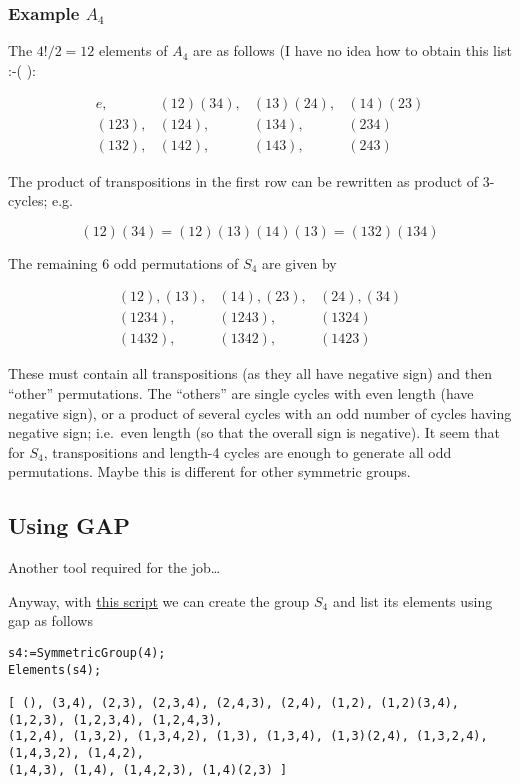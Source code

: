 \subsubsection{\texorpdfstring{Example
\(A_4\)}{Example A\_4}}\label{example-a_4}

The \(4! / 2 = 12\) elements of \(A_4\) are as follows (I have no idea
how to obtain this list :-( ):

\[
\begin{array}{cccc}
e, & (12)(34), &  (13)(24), &(14)(23) \\
(123), & (124), & (134), & (234) \\
(132), & (142), & (143), & (243)
\end{array}
\]

The product of transpositions in the first row can be rewritten as
product of 3-cycles; e.g.

\[
(12)(34) = (12)(13)(14)(13) = (132)(134)
\]

The remaining 6 odd permutations of \(S_4\) are given by

\[
\begin{array}{cccc}
(12), (13), & (14), (23), & (24), (34) \\
(1234), & (1243), & (1324)  \\
(1432), & (1342), & (1423)
\end{array}
\]

These must contain all transpositions (as they all have negative sign)
and then ``other'' permutations. The ``others'' are single cycles with
even length (have negative sign), or a product of several cycles with an
odd number of cycles having negative sign; i.e.~even length (so that the
overall sign is negative). It seem that for \(S_4\), transpositions and
length-4 cycles are enough to generate all odd permutations. Maybe this
is different for other symmetric groups.

\subsection{Using GAP}\label{using-gap}

Another tool required for the job\ldots{}

Anyway, with \href{\%7Bfilename\%7D/files/symmetric_group.g}{this
script} we can create the group \(S_4\) and list its elements using gap
as follows

\begin{verbatim}
s4:=SymmetricGroup(4);
Elements(s4);

[ (), (3,4), (2,3), (2,3,4), (2,4,3), (2,4), (1,2), (1,2)(3,4), (1,2,3), (1,2,3,4), (1,2,4,3), 
(1,2,4), (1,3,2), (1,3,4,2), (1,3), (1,3,4), (1,3)(2,4), (1,3,2,4), (1,4,3,2), (1,4,2), 
(1,4,3), (1,4), (1,4,2,3), (1,4)(2,3) ]
\end{verbatim}

